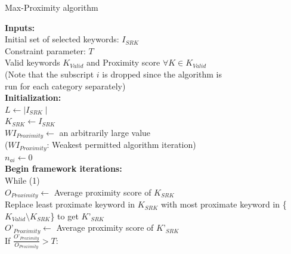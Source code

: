 \begin{algorithm}
\fontsize{8pt}{1em}\selectfont
\caption{Max-Proximity algorithm}
\label{algo:maxproximity}
\textbf{Inputs:}  \\ 
\hspace*{2mm}   Initial set of selected keywords: $I_{SRK}$ \\ 
\hspace*{2mm}   Constraint parameter: $T$ \\ 
\hspace*{2mm}   Valid keywords $K_{Valid}$ and Proximity score $\forall K \in  K_{Valid}$ \\ %
\hspace*{2mm}   (Note that the subscript $i$ is dropped since the algorithm is \\ 
\hspace*{2mm}   run for each category separately) \\ 
\textbf{Initialization:} \\ 
\hspace*{2mm}  $L \leftarrow \mid I_{SRK} \mid$ \\ 
\hspace*{2mm}   $K_{SRK} \leftarrow I_{SRK} $ \\   
\hspace*{2mm}   $WI_{Proximity} \leftarrow$ an arbitrarily large value \\ 
\hspace*{2mm}   ($WI_{Proximity}$: Weakest permitted algorithm iteration) \\ 
\hspace*{2mm}   $n_{ai} \leftarrow 0$ \\ 
\textbf{Begin framework iterations: } \\ 
\hspace*{2mm} While (1) 		 \\ 
\hspace*{6mm}        $O_{Proximity} \leftarrow $ Average proximity score of $K_{SRK}$ \\       
\hspace*{6mm}               Replace least proximate keyword in $K_{SRK}$ with most proximate keyword in \{$K_{Valid} \setminus K_{SRK}$\} to get $K\text{'}_{SRK}$  \\ 
\hspace*{6mm}               $O\text{'}_{Proximity} \leftarrow$ Average proximity score of $K\text{'}_{SRK}$ \\  
\hspace*{6mm}               If $\frac{O\text{'}_{Proximity}}{O_{Proximity}} > T$: \\ 

\end{algorithm}
